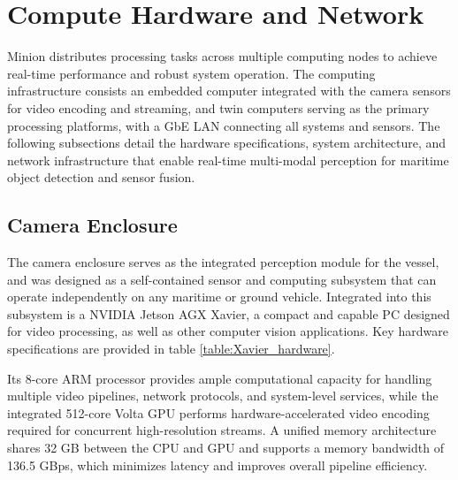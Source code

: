 \documentclass{erauthesis}
\begin{document}
\section{Compute Hardware and Network} \label{Atlas_LAN}

Minion distributes processing tasks across multiple computing nodes to achieve real-time performance and robust system operation.
The computing infrastructure consists an embedded computer integrated with the camera sensors for video encoding and streaming, and twin computers serving as the primary processing platforms, with a \ac{GbE} \ac{LAN} connecting all systems and sensors. 
The following subsections detail the hardware specifications, system architecture, and network infrastructure that enable real-time multi-modal perception for maritime object detection and sensor fusion.

\subsection{Camera Enclosure} \label{subsec:camera_enclosure}


The camera enclosure serves as the integrated perception module for the vessel, and was designed as a self-contained sensor and computing subsystem that can operate independently on any maritime or ground vehicle. 
Integrated into this subsystem is a NVIDIA Jetson AGX Xavier, a compact and capable PC designed for video processing, as well as other computer vision applications.
Key hardware specifications are provided in table \ref{table:Xavier_hardware}.

Its 8-core ARM processor provides ample computational capacity for handling multiple video pipelines, network protocols, and system-level services, while the integrated 512-core Volta GPU performs hardware-accelerated video encoding required for concurrent high-resolution streams.  
A unified memory architecture shares 32 GB between the CPU and GPU and supports a memory bandwidth of 136.5 GBps, which minimizes latency and improves overall pipeline efficiency.
\end{document}
